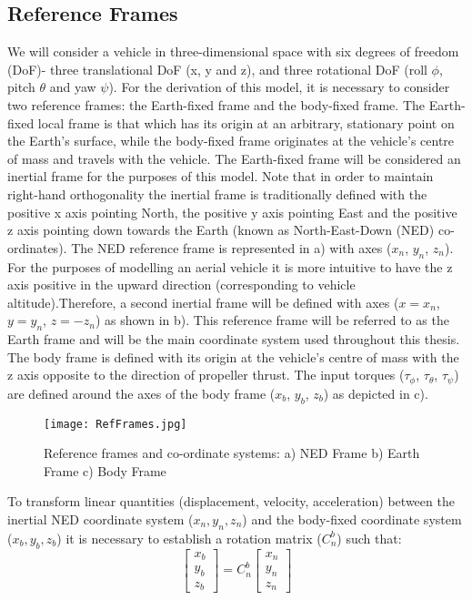 \subsection{Reference Frames}
We will consider a vehicle in three-dimensional space with six degrees of freedom (DoF)- three translational DoF (x, y and z), and three rotational DoF (roll $\phi$, pitch $\theta$ and yaw $\psi$). For the derivation of this model, it is necessary to consider two reference frames: the Earth-fixed frame and the body-fixed frame. The Earth-fixed local frame is that which has its origin at an arbitrary, stationary point on the Earth's surface, while the body-fixed frame originates at the vehicle's centre of mass and travels with the vehicle\cite{Nebylov2016}. The Earth-fixed frame will be considered an inertial frame for the purposes of this model. Note that in order to maintain right-hand orthogonality the inertial frame is traditionally defined with the positive x axis pointing North, the positive y axis pointing East and the positive z axis pointing down towards the Earth (known as North-East-Down (NED) co-ordinates). The NED reference frame is represented in  a) with axes ($x_{n}$, $y_{n}$, $z_{n}$). For the purposes of modelling an aerial vehicle it is more intuitive to have the z axis positive in the upward direction (corresponding to vehicle altitude).Therefore, a second inertial frame will be defined with axes ($x=x_{n}$, $y=y_{n}$, $z=-z_{n}$) as shown in  b). This reference frame will be referred to as the Earth frame and will be the main coordinate system used throughout this thesis. The body frame is defined with its origin at the vehicle's centre of mass with the z axis opposite to the direction of propeller thrust. The input torques ($\tau_{\phi}$, $\tau_{\theta}$, $\tau_{\psi}$) are defined around the axes of the body frame ($x_{b}$, $y_{b}$, $z_{b}$) as depicted in  c).\\


\begin{figure}[htb]
	\texttt{[image: RefFrames.jpg]}%
	\caption{Reference frames and co-ordinate systems: a) NED Frame b) Earth Frame c) Body Frame}%
	\label{fig:RefFrames}%
\end{figure}

To transform linear quantities (displacement, velocity, acceleration) between the inertial NED coordinate system ($x_{n}, y_{n}, z_{n}$) and the body-fixed coordinate system ($x_{b}, y_{b}, z_{b}$) it is necessary to establish a rotation matrix ($C^{b}_{n}$) such that:
\[
\begin{bmatrix}
x_{b}\\ y_{b}\\ z_{b}
\end{bmatrix} = C^{b}_{n}\begin{bmatrix}
x_{n}\\ y_{n}\\ z_{n}
\end{bmatrix}
\]

